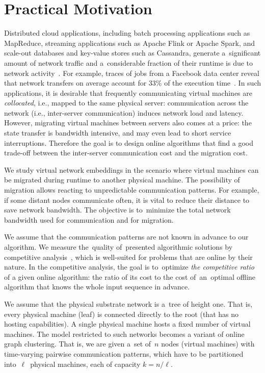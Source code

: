 \documentclass[manuscript,screen=true]{acmart}
\begin{document}
\section{Practical Motivation}


Distributed cloud applications, including batch processing
applications such as MapReduce, streaming applications such as Apache Flink or
Apache Spark, and scale-out databases and key-value stores such as Cassandra,
generate a~significant amount of network traffic and a~considerable fraction
of their runtime is due to network activity~\cite{MogPop12}. For example,
traces of jobs from a Facebook data center reveal that network transfers on
average account for 33\% of the execution time~\cite{orchestra}. In such
applications, it is desirable that frequently communicating virtual machines
are \emph{collocated}, i.e., mapped to the same physical server: 
communication across the network (i.e., inter-server communication) induces
network load and latency. However, migrating virtual machines between servers
also comes at a price: the state transfer is bandwidth intensive, and may even
lead to short service interruptions. Therefore the goal is to design online
algorithms that find a good trade-off between the inter-server communication
cost and the migration cost.


\vspace{1cm}

We study virtual network embeddings in the scenario where virtual machines can be migrated during runtime to another physical machine.
The possibility of migration allows reacting to unpredictable communication patterns.
For example, if some distant nodes communicate often, it is vital to reduce their distance to save network bandwidth.
The objective is to~minimize the total network bandwidth used for communication and for migration.


We assume that the communication patterns are not known in advance to our algorithm.
We measure the~quality of~presented algorithmic solutions by competitive analysis~\cite{borodin-book}, which is well-suited for problems that are online by their nature.
In the competitive analysis, the goal is to~optimize \emph{the competitive ratio} of a given online algorithm: the ratio of its cost to the cost of~an~optimal offline algorithm that knows the whole input sequence in advance.

We assume that the physical substrate network is a~tree of height one.
That is, every physical machine (leaf) is connected directly to the root (that has no hosting capabilities).
A single physical machine hosts a fixed number of virtual machines.
The model restricted to such networks becomes a variant of online graph clustering.
That is, we are given a~set of~$n$ nodes (virtual machines) with time-varying pairwise
communication patterns, which have to be partitioned into~$\ell$~physical machines, each of
capacity $k=n/\ell$.
\end{document}

